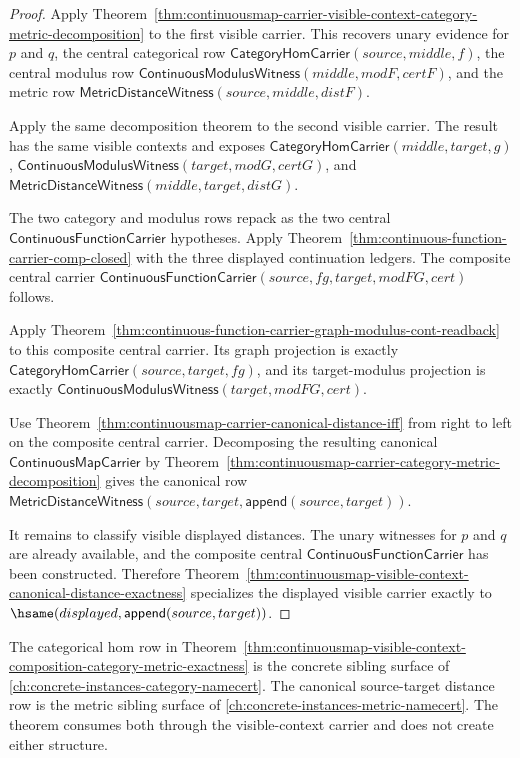 \begin{proof}
Apply
Theorem~\ref{thm:continuousmap-carrier-visible-context-category-metric-decomposition}
to the first visible carrier. This recovers unary evidence for $p$ and $q$,
the central categorical row
$\mathsf{CategoryHomCarrier}(source,middle,f)$, the central modulus row
$\mathsf{ContinuousModulusWitness}(middle,modF,certF)$, and the metric row
$\mathsf{MetricDistanceWitness}(source,middle,distF)$.

Apply the same decomposition theorem to the second visible carrier. The result
has the same visible contexts and exposes
$\mathsf{CategoryHomCarrier}(middle,target,g)$,
$\mathsf{ContinuousModulusWitness}(target,modG,certG)$, and
$\mathsf{MetricDistanceWitness}(middle,target,distG)$.

The two category and modulus rows repack as the two central
$\mathsf{ContinuousFunctionCarrier}$ hypotheses. Apply
Theorem~\ref{thm:continuous-function-carrier-comp-closed} with the three
displayed continuation ledgers. The composite central carrier
$\mathsf{ContinuousFunctionCarrier}(source,fg,target,modFG,cert)$ follows.

Apply
Theorem~\ref{thm:continuous-function-carrier-graph-modulus-cont-readback} to
this composite central carrier. Its graph projection is exactly
$\mathsf{CategoryHomCarrier}(source,target,fg)$, and its target-modulus
projection is exactly
$\mathsf{ContinuousModulusWitness}(target,modFG,cert)$.

Use Theorem~\ref{thm:continuousmap-carrier-canonical-distance-iff} from right
to left on the composite central carrier. Decomposing the resulting canonical
$\mathsf{ContinuousMapCarrier}$ by
Theorem~\ref{thm:continuousmap-carrier-category-metric-decomposition} gives
the canonical row
$\mathsf{MetricDistanceWitness}(source,target,\mathsf{append}(source,target))$.

It remains to classify visible displayed distances. The unary witnesses for
$p$ and $q$ are already available, and the composite central
$\mathsf{ContinuousFunctionCarrier}$ has been constructed. Therefore
Theorem~\ref{thm:continuousmap-visible-context-canonical-distance-exactness}
specializes the displayed visible carrier exactly to
$\hsame(displayed,\mathsf{append}(source,target))$.
\end{proof}

The categorical hom row in
Theorem~\ref{thm:continuousmap-visible-context-composition-category-metric-exactness}
is the concrete sibling surface of
\autoref{ch:concrete-instances-category-namecert}. The canonical
source-target distance row is the metric sibling surface of
\autoref{ch:concrete-instances-metric-namecert}. The theorem consumes both
through the visible-context carrier and does not create either structure.

